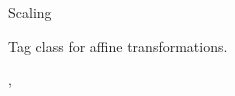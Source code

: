 \begin{ccRefClass}{Scaling}

\ccDefinition
Tag class for affine transformations.

\ccSeeAlso
{}, 
\end{ccRefClass}
